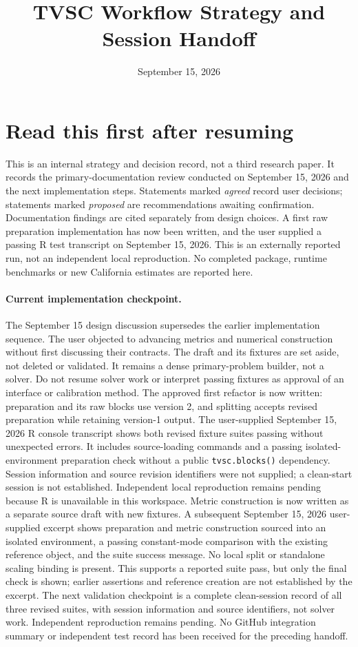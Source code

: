 \documentclass[11pt]{article}
\title{TVSC Workflow Strategy and Session Handoff}
\author{}
\date{September 15, 2026}
\begin{document}
\maketitle

\section{Read this first after resuming}
This is an internal strategy and decision record, not a third research
paper. It records the primary-documentation review conducted on September
15, 2026 and the next implementation steps. Statements marked
\emph{agreed} record user decisions; statements marked \emph{proposed}
are recommendations awaiting confirmation. Documentation findings are
cited separately from design choices. A first raw preparation implementation
has now been written, and the user supplied a passing R test transcript on
September 15, 2026. This is an externally reported run, not an independent
local reproduction. No completed package, runtime benchmarks or new
California estimates are reported here.

\paragraph{Current implementation checkpoint.}
The September 15 design discussion supersedes the earlier implementation
sequence. The user objected to advancing metrics and numerical construction
without first discussing their contracts. The 
draft and its fixtures are set aside, not deleted or validated. It remains
a dense primary-problem builder, not a solver. Do not resume solver work
or interpret passing fixtures as approval of an interface or calibration
method. The approved first refactor is now written: preparation and its
raw blocks use version 2, and splitting accepts revised preparation while
retaining version-1 output. The user-supplied September 15, 2026 R console
transcript shows both revised fixture suites passing without unexpected
errors. It includes source-loading commands and a passing isolated-environment
preparation check without a public \texttt{tvsc.blocks()} dependency.
Session information and source revision identifiers were not supplied;
a clean-start session is not established. Independent local reproduction
remains pending because R is unavailable in this workspace. Metric
construction is now written as a separate source draft with new fixtures.
A subsequent September 15, 2026 user-supplied excerpt shows preparation and
metric construction sourced into an isolated environment, a passing
constant-mode comparison with the existing reference object, and the
suite success message. No local split or standalone scaling binding is
present. This supports a reported suite pass, but only the final check is
shown; earlier assertions and reference creation are not established by
the excerpt. The next validation checkpoint is a complete clean-session
record of all three revised suites, with session information and source
identifiers, not solver work. Independent reproduction remains pending.
No GitHub integration summary or independent test
record has been received for the preceding handoff.
\end{document}
